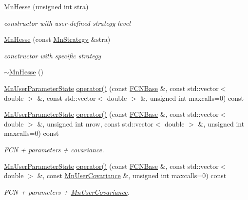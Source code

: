 \begin{DoxyCompactItemize}
\mbox{\hyperlink{classROOT_1_1Minuit2_1_1MnHesse_ad68578086b8b53c029be88acdfe5ec62}{Mn\+Hesse}} (unsigned int stra)
\begin{DoxyCompactList}\small\item\em constructor with user-\/defined strategy level \end{DoxyCompactList}\item 
\mbox{\hyperlink{classROOT_1_1Minuit2_1_1MnHesse_a06f4f5211bf9c85c8a94fe3be518cdeb}{Mn\+Hesse}} (const \mbox{\hyperlink{classROOT_1_1Minuit2_1_1MnStrategy}{Mn\+Strategy}} \&stra)
\begin{DoxyCompactList}\small\item\em conctructor with specific strategy \end{DoxyCompactList}\item 
\mbox{\hyperlink{classROOT_1_1Minuit2_1_1MnHesse_a7e8672c0a87502a0c75c6c0f9923f7b8}{$\sim$\+Mn\+Hesse}} ()
\item 
\mbox{\hyperlink{classROOT_1_1Minuit2_1_1MnUserParameterState}{Mn\+User\+Parameter\+State}} \mbox{\hyperlink{classROOT_1_1Minuit2_1_1MnHesse_aa0af93c1c82038bab7ffe84c198fa176}{operator()}} (const \mbox{\hyperlink{classROOT_1_1Minuit2_1_1FCNBase}{F\+C\+N\+Base}} \&, const std\+::vector$<$ double $>$ \&, const std\+::vector$<$ double $>$ \&, unsigned int maxcalls=0) const
\item 
\mbox{\hyperlink{classROOT_1_1Minuit2_1_1MnUserParameterState}{Mn\+User\+Parameter\+State}} \mbox{\hyperlink{classROOT_1_1Minuit2_1_1MnHesse_aa02f8d7bd10ea245658c9c1b3e296a45}{operator()}} (const \mbox{\hyperlink{classROOT_1_1Minuit2_1_1FCNBase}{F\+C\+N\+Base}} \&, const std\+::vector$<$ double $>$ \&, unsigned int nrow, const std\+::vector$<$ double $>$ \&, unsigned int maxcalls=0) const
\begin{DoxyCompactList}\small\item\em F\+CN + parameters + covariance. \end{DoxyCompactList}\item 
\mbox{\hyperlink{classROOT_1_1Minuit2_1_1MnUserParameterState}{Mn\+User\+Parameter\+State}} \mbox{\hyperlink{classROOT_1_1Minuit2_1_1MnHesse_a5d575c4f72e0024578b07579a7e3a4a3}{operator()}} (const \mbox{\hyperlink{classROOT_1_1Minuit2_1_1FCNBase}{F\+C\+N\+Base}} \&, const std\+::vector$<$ double $>$ \&, const \mbox{\hyperlink{classROOT_1_1Minuit2_1_1MnUserCovariance}{Mn\+User\+Covariance}} \&, unsigned int maxcalls=0) const
\begin{DoxyCompactList}\small\item\em F\+CN + parameters + \mbox{\hyperlink{classROOT_1_1Minuit2_1_1MnUserCovariance}{Mn\+User\+Covariance}}. \end{DoxyCompactList}\item 

\end{DoxyCompactItemize}
